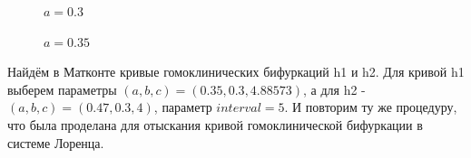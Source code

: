 \documentclass[12pt, a4paper]{article}
\begin{document}
\begin{figure}[H]
	\caption{$a = 0.3$}
\end{figure}

\begin{figure}[H]
	\caption{$a = 0.35$}
\end{figure}

Найдём в Матконте кривые гомоклинических бифуркаций h1 и h2. Для кривой h1 выберем параметры $(a, b, c) = (0.35, 0.3, 4.88573)$, а для h2 - $(a, b, c) = (0.47, 0.3, 4)$, параметр $interval = 5$. И повторим ту же процедуру, что была проделана для отыскания кривой гомоклинической бифуркации в системе Лоренца.
\end{document}
